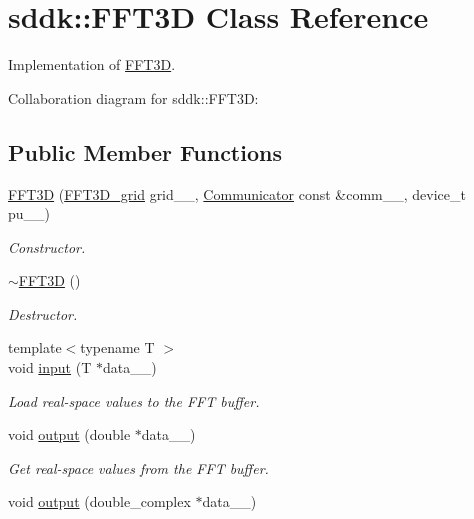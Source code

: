 \hypertarget{classsddk_1_1_f_f_t3_d}{}\section{sddk\+:\+:F\+F\+T3\+D Class Reference}
\label{classsddk_1_1_f_f_t3_d}


Implementation of \hyperlink{classsddk_1_1_f_f_t3_d}{F\+F\+T3\+D}.  




Collaboration diagram for sddk\+:\+:F\+F\+T3\+D\+:
\subsection*{Public Member Functions}
\begin{DoxyCompactItemize}
\item 
\hyperlink{classsddk_1_1_f_f_t3_d_ac8d7287758804ef388c88f92667d2701}{F\+F\+T3\+D} (\hyperlink{classsddk_1_1_f_f_t3_d__grid}{F\+F\+T3\+D\+\_\+grid} grid\+\_\+\+\_\+, \hyperlink{classsddk_1_1_communicator}{Communicator} const \&comm\+\_\+\+\_\+, device\+\_\+t pu\+\_\+\+\_\+)
\begin{DoxyCompactList}\small\item\em Constructor. \end{DoxyCompactList}\item 
\hyperlink{classsddk_1_1_f_f_t3_d_a99148c7bef387d11955222c369a14d11}{$\sim$\+F\+F\+T3\+D} ()
\begin{DoxyCompactList}\small\item\em Destructor. \end{DoxyCompactList}\item 
{\footnotesize template$<$typename T $>$ }\\void \hyperlink{classsddk_1_1_f_f_t3_d_ad21e23460b01e6db30c68190fa805f24}{input} (T $\ast$data\+\_\+\+\_\+)
\begin{DoxyCompactList}\small\item\em Load real-\/space values to the F\+F\+T buffer. \end{DoxyCompactList}\item 
void \hyperlink{classsddk_1_1_f_f_t3_d_adb2b7a3c5bb4a7b0bfe07681f4ee249f}{output} (double $\ast$data\+\_\+\+\_\+)
\begin{DoxyCompactList}\small\item\em Get real-\/space values from the F\+F\+T buffer. \end{DoxyCompactList}\item 
void \hyperlink{classsddk_1_1_f_f_t3_d_a2f0629ac5f4003896e4dec63f12adda4}{output} (double\+\_\+complex $\ast$data\+\_\+\+\_\+)

\end{DoxyCompactItemize}
